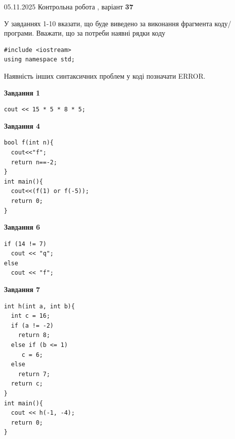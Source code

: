 \documentclass[12pt, ukrainian]{article}
\begin{document}
\newpage

{\Large{05.11.2025 Контрольна робота , варіант  \No \textbf { 37 }\par}}
{
\begin {large}
У завданнях 1-10 вказати, що буде виведено за виконання фрагмента коду/про\-гра\-ми.
Вважати, що за потреби наявні рядки коду
\begin{verbatim}
#include <iostream>
using namespace std;
\end{verbatim}
Наявність інших синтаксичних проблем у коді позначати ERROR.

\begin{minipage}[t]{7.0cm}

\begin{center}
\textbf{Завдання 1}
\end{center}
\vspace{-8mm}

\begin{verbatim}
cout << 15 * 5 * 8 * 5;
\end{verbatim}



\begin{center}
\textbf{Завдання 4}
\end{center}
\vspace{-8mm}

\begin{verbatim}
bool f(int n){
  cout<<"f";
  return n==-2;
}
int main(){
  cout<<(f(1) or f(-5));
  return 0;
}
\end{verbatim}



\begin{center}
\textbf{Завдання 6}
\end{center}
\vspace{-8mm}

\begin{verbatim}
if (14 != 7)
  cout << "q";
else
  cout << "f";
\end{verbatim}



\begin{center}
\textbf{Завдання 7}
\end{center}
\vspace{-8mm}

\begin{verbatim}
int h(int a, int b){
  int c = 16;
  if (a != -2)
    return 8;
  else if (b <= 1)
     c = 6;
  else
    return 7;
  return c;
}
int main(){
  cout << h(-1, -4);
  return 0;
}
\end{verbatim}


\end{minipage}
\end{large}}
\end{document}
